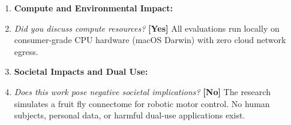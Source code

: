 \documentclass{article}
\begin{document}
\begin{enumerate}
\item \textbf{Compute and Environmental Impact:}
  \item[] \textit{Did you discuss compute resources?} \textbf{[Yes]} All evaluations run locally on consumer-grade CPU hardware (macOS Darwin) with zero cloud network egress.
\item \textbf{Societal Impacts and Dual Use:}
  \item[] \textit{Does this work pose negative societal implications?} \textbf{[No]} The research simulates a fruit fly connectome for robotic motor control. No human subjects, personal data, or harmful dual-use applications exist.
\end{enumerate}
\end{document}
